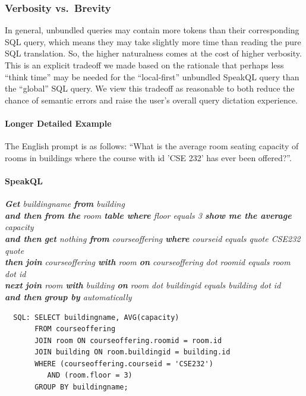 \vspace{1mm}
\subsubsection{\textbf{Verbosity vs.~Brevity}} 

In general, unbundled queries may contain more tokens than their corresponding SQL query, which means they may take slightly more time than reading the pure SQL translation. 
So, the higher naturalness comes at the cost of higher verbosity. 
This is an explicit tradeoff we made based on the rationale that perhaps less ``think time'' may be needed for the ``local-first'' unbundled SpeakQL query than the ``global'' SQL query.
We view this tradeoff as reasonable to both reduce the chance of semantic errors and raise the user's overall query dictation experience.



\paragraph{\textbf{Longer Detailed Example}}

The English prompt is as follows: ``What is the average room seating capacity of rooms in buildings where the course with id 'CSE 232' has ever been offered?''.

\paragraph{SpeakQL} 
\emph{
  \textbf{Get} buildingname \textbf{from} building \\
  \textbf{and then}
  \textbf{from the} room \textbf{table where} floor equals 3 \textbf{show me the average} capacity \\
  \textbf{and then}
  \textbf{get} nothing \textbf{from} courseoffering \textbf{where} courseid equals quote CSE232 quote \\
  \textbf{then}
  \textbf{join} courseoffering \textbf{with} room \textbf{on} courseoffering dot roomid equals room dot id \\
  \textbf{next}
  \textbf{join} room \textbf{with} building \textbf{on} room dot buildingid equals building dot id \\
  \textbf{and then}
  \textbf{group by} automatically
}

\begin{verbatim}
  SQL: SELECT buildingname, AVG(capacity)
       FROM courseoffering
       JOIN room ON courseoffering.roomid = room.id
       JOIN building ON room.buildingid = building.id
       WHERE (courseoffering.courseid = 'CSE232')
          AND (room.floor = 3)
       GROUP BY buildingname;
\end{verbatim}




